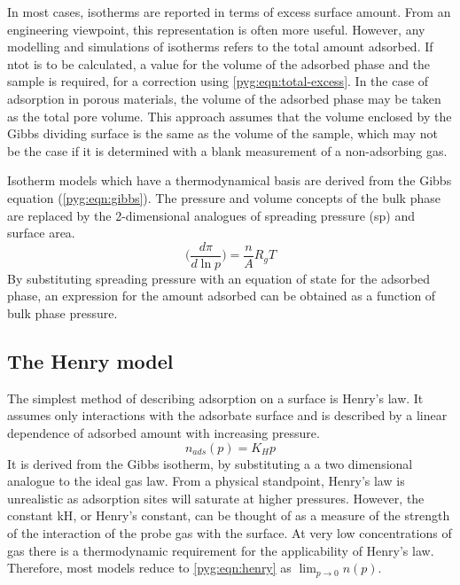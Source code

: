 In most cases, isotherms are reported in terms of excess surface 
amount. From an engineering viewpoint, this representation
is often more useful. However, any modelling and simulations of 
isotherms refers to the total amount adsorbed.
If \gls{ntot} is to be calculated, a value
for the volume of the adsorbed phase and the sample is required, for a 
correction using \autoref{pyg:eqn:total-excess}.
In the case of adsorption in porous materials, the volume of the
adsorbed phase may be taken as the total pore volume. This approach
assumes that the volume enclosed by the Gibbs dividing surface is
the same as the volume of the sample, which may not be the case 
if it is determined with a blank measurement of a 
non-adsorbing gas.

Isotherm models which have a thermodynamical basis are derived
from the Gibbs equation (\autoref{pyg:eqn:gibbs}). 
The pressure and volume concepts of the bulk phase
are replaced by the 2-dimensional analogues of spreading pressure 
(\gls{sp}) and surface area.
%
\begin{equation}\label{pyg:eqn:gibbs}
	\Big(\frac{d\pi}{d\ln{p}}\Big) = \frac{n}{A} R_g T
\end{equation}
%
By substituting spreading pressure with an equation
of state for the adsorbed phase, an expression for the amount
adsorbed can be obtained as a function of bulk phase pressure.

\subsection{The Henry model}\label{pyg:models:henry}

The simplest method of describing adsorption on a
surface is Henry’s law. It assumes only interactions
with the adsorbate surface and is described by a
linear dependence of adsorbed amount with
increasing pressure.
%
\begin{equation}\label{pyg:eqn:henry}
	n_{ads}(p) = K_H p
\end{equation}
%
It is derived from the Gibbs isotherm, by substituting a
a two dimensional analogue to the ideal gas law.
From a physical standpoint, Henry's law is unrealistic as adsorption sites
will saturate at higher pressures. However, the constant \gls{kH},
or Henry’s constant, can be thought of as a measure of the strength
of the interaction of the probe gas with the surface. At very
low concentrations of gas there is a
thermodynamic requirement for the applicability of Henry's law.
Therefore, most models reduce to \autoref{pyg:eqn:henry}
as \(\lim_{p \to 0} n(p)\).

